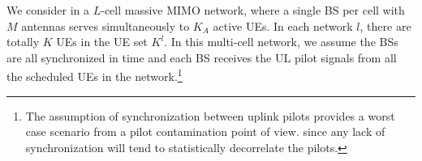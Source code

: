 We consider in a $L$-cell massive MIMO network, where a single BS per cell %
with $M$ antennas %
serves simultaneously to $K_A$ active UEs. In each network $l$, there are totally $K$ UEs in the UE set $K^l$. In this multi-cell network, we assume the BSs are all synchronized in time and each BS receives the UL pilot signals from all the scheduled UEs in the network.\footnote{The assumption of synchronization between uplink pilots provides a worst
case scenario from a pilot contamination point of view. since any lack of
synchronization will tend to statistically decorrelate the pilots.}
